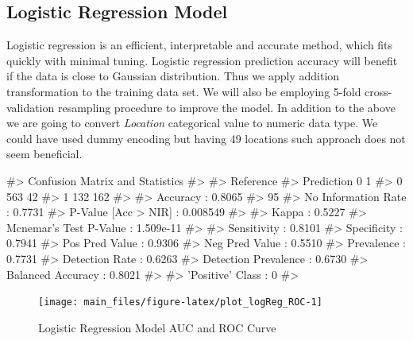 \hypertarget{logistic-regression-model}{%
\subsection{Logistic Regression Model}\label{logistic-regression-model}}

Logistic regression is an efficient, interpretable and accurate method,
which fits quickly with minimal tuning. Logistic regression prediction
accuracy will benefit if the data is close to Gaussian distribution.
Thus we apply addition transformation to the training data set. We will
also be employing 5-fold cross-validation resampling procedure to
improve the model. In addition to the above we are going to convert
\emph{Location} categorical value to numeric data type. We could have
used dummy encoding but having 49 locations such approach does not seem
beneficial.

\begin{Schunk}
\begin{Soutput}
#> Confusion Matrix and Statistics
#> 
#>           Reference
#> Prediction   0   1
#>          0 563  42
#>          1 132 162
#>                                           
#>                Accuracy : 0.8065          
#>                  95%
#>     No Information Rate : 0.7731          
#>     P-Value [Acc > NIR] : 0.008549        
#>                                           
#>                   Kappa : 0.5227          
#>  Mcnemar's Test P-Value : 1.509e-11       
#>                                           
#>             Sensitivity : 0.8101          
#>             Specificity : 0.7941          
#>          Pos Pred Value : 0.9306          
#>          Neg Pred Value : 0.5510          
#>              Prevalence : 0.7731          
#>          Detection Rate : 0.6263          
#>    Detection Prevalence : 0.6730          
#>       Balanced Accuracy : 0.8021          
#>                                           
#>        'Positive' Class : 0               
#> 
\end{Soutput}
\end{Schunk}

\begin{Schunk}
\begin{figure}[H]

{\centering \texttt{[image: main\_files/figure-latex/plot\_logReg\_ROC-1]} 

}

\caption[Logistic Regression Model AUC and ROC Curve]{Logistic Regression Model AUC and ROC Curve}\label{fig:plot_logReg_ROC}
\end{figure}
\end{Schunk}

